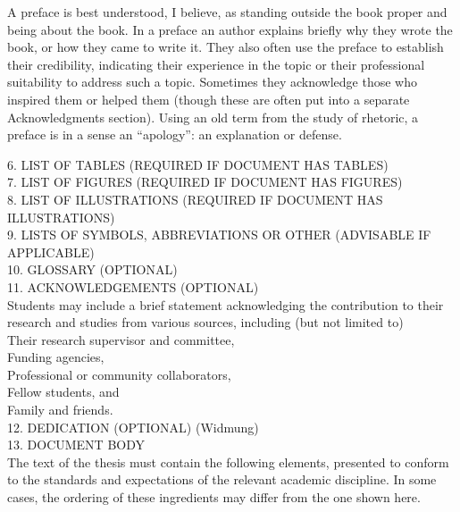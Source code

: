   A preface is best understood, I believe, as standing outside the book proper and being about the 
    book. In a preface an author explains briefly why they wrote the book, or how they came to write 
    it. They also often use the preface to establish their credibility, indicating their experience 
    in the topic or their professional suitability to address such a topic. Sometimes they 
    acknowledge those who inspired them or helped them (though these are often put into a separate 
    Acknowledgments section). Using an old term from the study of rhetoric, a preface is in a sense 
    an “apology”: an explanation or defense.

\tableofcontents
\clearpage

6. LIST OF TABLES (REQUIRED IF DOCUMENT HAS TABLES) \\
7. LIST OF FIGURES (REQUIRED IF DOCUMENT HAS FIGURES) \\
8. LIST OF ILLUSTRATIONS (REQUIRED IF DOCUMENT HAS ILLUSTRATIONS) \\
9. LISTS OF SYMBOLS, ABBREVIATIONS OR OTHER (ADVISABLE IF APPLICABLE) \\
10. GLOSSARY (OPTIONAL) \\
11. ACKNOWLEDGEMENTS (OPTIONAL) \\
  Students may include a brief statement acknowledging the contribution to their research and 
    studies from various sources, including (but not limited  to) \\

  Their research supervisor and committee, \\
  Funding agencies, \\
  Professional or community collaborators, \\
  Fellow students, and \\
  Family and friends. \\

12. DEDICATION (OPTIONAL) (Widmung) \\

13. DOCUMENT BODY \\
  The text of the thesis must contain the following elements, presented to conform to the standards 
    and expectations of the relevant academic discipline. In some cases, the ordering of these 
    ingredients may differ from the one shown here. \\

